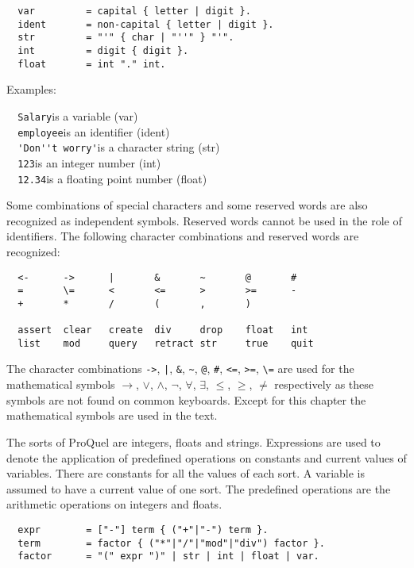 \begin{verbatim}
  var         = capital { letter | digit }.
  ident       = non-capital { letter | digit }.
  str         = "'" { char | "''" } "'".
  int         = digit { digit }.
  float       = int "." int.
\end{verbatim}

Examples:

\verb/  Salary/\quad is a variable (var) \\
\verb/  employee/\quad is an identifier (ident) \\
\verb/  'Don''t worry'/\quad is a character string (str) \\
\verb/  123/\quad is an integer number (int) \\
\verb/  12.34/\quad is a floating point number (float)

Some combinations of special characters and some reserved words are also recognized as independent 
symbols. Reserved words cannot be used in the role of identifiers. The following character 
combinations and reserved words are recognized:

\begin{verbatim}
  <-      ->      |       &       ~       @       #
  =       \=      <       <=      >       >=      -
  +       *       /       (       ,       )

  assert  clear   create  div     drop    float   int
  list    mod     query   retract str     true    quit
\end{verbatim}

The character combinations \verb.->., \verb.|., \verb.&., \verb.~., \verb.@., \verb.#., \verb.<=., 
\verb.>=., \verb.\=. are used for the mathematical symbols $\rightarrow$, $\vee$, $\wedge$, $\neg$, 
$\forall$, $\exists$, $\leq$, $\geq$, $\not=$ respectively as these symbols are not found on 
common keyboards. Except for this chapter the mathematical symbols are used in the text.

\label{secqueryfac}
The sorts of ProQuel are integers, floats and strings. Expressions are used to denote the 
application of predefined operations on constants and current values of variables. There are 
constants for all the values of each sort. A variable is assumed to have a current value of one 
sort. The predefined operations are the arithmetic operations on integers and floats.

\begin{verbatim}
  expr        = ["-"] term { ("+"|"-") term }.
  term        = factor { ("*"|"/"|"mod"|"div") factor }.
  factor      = "(" expr ")" | str | int | float | var.
\end{verbatim}


